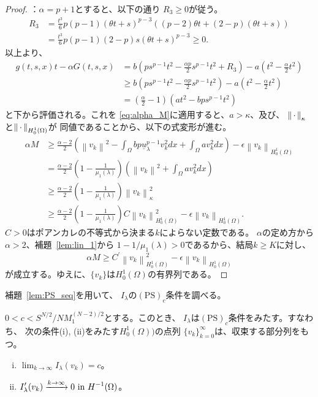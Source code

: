 \begin{proof}
 ：$\alpha = p + 1$とすると、以下の通り
 $R_3 \geq 0$が従う。
 \begin{align*}
  R_3 &= \frac{t^3}{6} p(p-1)(\theta t + s)^{p-3} \left( (p-2)\theta t
  + (2-p) (\theta t + s)\right) \\
  &= \frac{t^3}{6}p(p-1)(2-p) s (\theta t + s)^{p-3} \geq 0.
 \end{align*}
 以上より、
 \begin{align*}
  g(t, s, x)t - \alpha G(t, s, x) &= b\left( ps^{p-1}t^2 -
  \frac{\alpha p}{2} s^{p-1} t^2 + R_3 \right) - a \left( t^2 -
  \frac{\alpha}{2} t^2 \right) \\
  & \geq b\left( ps^{p-1}t^2 -
  \frac{\alpha p}{2} s^{p-1} t^2 \right) - a \left( t^2 -
  \frac{\alpha}{2} t^2 \right) \\
  & = \left( \frac{\alpha}{2} - 1 \right) \left( at^2 - bps^{p-1} t^2 \right)
 \end{align*}
 と下から評価される。これを
 \eqref{eq:alpha_M}に適用すると、$a >
 \kappa$、及び、
 $\left\|\, \cdot \, \right\|_\kappa$と$\left\|\, \cdot \, \right\|_{H_0^1(\Omega)}$が
 同値であることから、以下の式変形が進む。
 \begin{align*}
  \alpha M &\geq \frac{\alpha-2}{2} \left( \left\| v_k \right\|^2 -
  \int_\Omega bp \underline{u}_\lambda^{p-1} v_k^2 dx + \int_\Omega
  av_k^2 dx \right) - \epsilon \left\| v_k \right\|_{H_0^1(\Omega)} \\
  & =\frac{\alpha -2}{2} \left( 1 - \frac{1}{\mu_1(\lambda)} \right)
  \left( \left\| v_k \right\|^2 + \int_\Omega av_k^2 dx \right) \\
  & \geq \frac{\alpha -2}{2} \left( 1 - \frac{1}{\mu_1(\lambda)}
  \right) \left\| v_k \right\|_\kappa^2 \\
  & \geq  \frac{\alpha -2}{2} \left( 1 - \frac{1}{\mu_1(\lambda)}
  \right) C \left\| v_k \right\|_{H_0^1(\Omega)}^2 - \epsilon \left\|
  v_k \right\|_{H_0^1(\Omega)}.
 \end{align*}
 $C >0$はポアンカレの不等式から決まる$k$によらない定数である。
 $\alpha$の定め方から$\alpha > 2$、補題~\ref{lem:lin_1}から
 $1 - 1/\mu_1(\lambda) > 0$であるから、結局$k \geq K$に対し、
 \[
  \alpha M \geq C^\prime \left\| v_k \right\|_{H_0^1(\Omega)}^2 - \epsilon
 \left\| v_k \right\|_{H_0^1(\Omega)}
 \]
 が成立する。ゆえに、$\{ v_k \}$は$H_0^1(\Omega)$の有界列である。 \qedhere
\end{proof}

補題~\ref{lem:PS_seq}を用いて、
$I_\lambda$の$(\mathrm{PS})_c$条件を調べる。

\begin{lem} \label{lem:PS_c}
 $0 < c < S^{N/2}/NM_1^{(N-2)/2}$とする。このとき、
 $I_\lambda$は$(\mathrm{PS})_c$条件をみたす。すなわち、
 次の条件(i), (ii)をみたす$H_0^1(\Omega))$の点列
 $\{ v_k \}_{k = 0}^\infty$は、収束する部分列をもつ。
 \begin{enumerate}[(i)]
  \item $\displaystyle \lim_{k \to \infty} I_\lambda (v_k) = c$。
  \item $\displaystyle I^\prime_\lambda (v_k) \xrightarrow{k \to
        \infty} 0 ~\text{in}~ H^{-1}(\Omega)$。
 \end{enumerate}
\end{lem}

